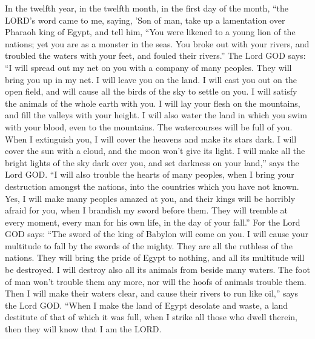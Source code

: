  In the twelfth year, in the twelfth month, in the first day
of the month, ``the LORD's word came to me, saying,  'Son of
man, take up a lamentation over Pharaoh king of Egypt, and tell him,
``You were likened to a young lion of the nations; yet you are as a
monster in the seas. You broke out with your rivers, and troubled the
waters with your feet, and fouled their rivers.''  The Lord
GOD says: ``I will spread out my net on you with a company of many
peoples. They will bring you up in my net.  I will leave you
on the land. I will cast you out on the open field, and will cause all
the birds of the sky to settle on you. I will satisfy the animals of the
whole earth with you.  I will lay your flesh on the
mountains, and fill the valleys with your height.  I will
also water the land in which you swim with your blood, even to the
mountains. The watercourses will be full of you.  When I
extinguish you, I will cover the heavens and make its stars dark. I will
cover the sun with a cloud, and the moon won't give its light.
 I will make all the bright lights of the sky dark over you,
and set darkness on your land,'' says the Lord GOD.  ``I
will also trouble the hearts of many peoples, when I bring your
destruction amongst the nations, into the countries which you have not
known.  Yes, I will make many peoples amazed at you, and
their kings will be horribly afraid for you, when I brandish my sword
before them. They will tremble at every moment, every man for his own
life, in the day of your fall.''  For the Lord GOD says:
``The sword of the king of Babylon will come on you.  I
will cause your multitude to fall by the swords of the mighty. They are
all the ruthless of the nations. They will bring the pride of Egypt to
nothing, and all its multitude will be destroyed.  I will
destroy also all its animals from beside many waters. The foot of man
won't trouble them any more, nor will the hoofs of animals trouble them.
 Then I will make their waters clear, and cause their
rivers to run like oil,'' says the Lord GOD.  ``When I make
the land of Egypt desolate and waste, a land destitute of that of which
it was full, when I strike all those who dwell therein, then they will
know that I am the LORD.

